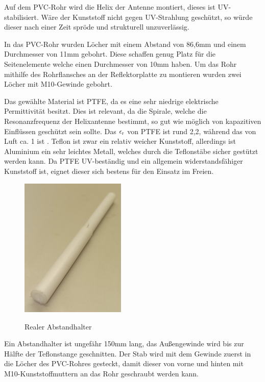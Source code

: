 Auf dem PVC-Rohr wird die Helix der Antenne montiert, dieses ist UV-stabilisiert. Wäre der Kunststoff nicht gegen UV-Strahlung geschützt, so würde dieser nach einer Zeit spröde und strukturell unzuverlässig.

In das PVC-Rohr wurden Löcher mit einem Abstand von 86,6mm und einem Durchmesser von 11mm gebohrt. Diese schaffen genug Platz für die Seitenelemente welche einen Durchmesser von 10mm haben. Um das Rohr mithilfe des Rohrflansches an der Reflektorplatte zu montieren wurden zwei Löcher mit M10-Gewinde gebohrt.

Das gewählte Material ist PTFE, da es eine sehr niedrige elektrische Permittivität besitzt. Dies ist relevant, da die Spirale, welche die Resonanzfrequenz der Helixantenne bestimmt, so gut wie möglich von kapazitiven Einflüssen geschützt sein sollte. Das $\epsilon\textsubscript{r}$ von PTFE ist rund 2,2, während das von Luft ca. 1 ist \cite{lipinski_polytetrafluorethylen_nodate,noauthor_dielektrizitatskonstante_nodate}. Teflon ist zwar ein relativ weicher Kunststoff, allerdings ist Aluminium ein sehr leichtes Metall, welches durch die Teflonstäbe sicher gestützt werden kann. Da PTFE UV-beständig und ein allgemein widerstandsfähiger Kunststoff ist, eignet dieser sich bestens für den Einsatz im Freien.

\begin{figure}[H]
	\centering
	\includegraphics[width=5cm]{../ref/Abstandhalter-real.jpg}
	\label{fig:Abstandhalter-real}
	\caption{Realer Abstandhalter}
\end{figure}

Ein Abstandhalter ist ungefähr 150mm lang, das Außengewinde wird bis zur Hälfte der Teflonstange geschnitten. Der Stab wird mit dem Gewinde zuerst in die Löcher des PVC-Rohres gesteckt, damit dieser von vorne und hinten mit M10-Kunststoffmuttern an das Rohr geschraubt werden kann.

